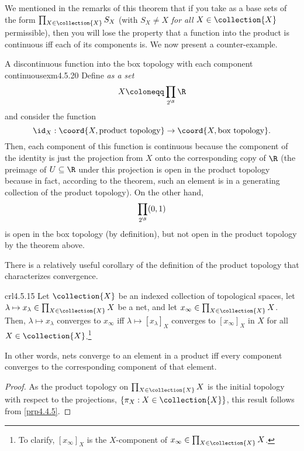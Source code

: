 We mentioned in the remarks of this theorem that if you take as a base sets of the form $\prod _{X\in \collection{X}}S_X$ (with $S_X\neq X$ \emph{for all $X\in \collection{X}$} permissible), then you will lose the property that a function into the product is continuous iff each of its components is.  We now present a counter-example.
\begin{exm}{A discontinuous function into the box topology with each component continuous}{exm4.5.20}
Define \emph{as a set}
\begin{equation}
X\coloneqq \prod _{2^{\N}}\R 
\end{equation}
and consider the function
\begin{equation}
\id _X:\coord{X,\text{product topology}}\rightarrow \coord{X,\text{box topology}}.
\end{equation}
Then, each component of this function is continuous because the component of the identity is just the projection from $X$ onto the corresponding copy of $\R$ (the preimage of $U\subseteq \R$ under this projection is open in the product topology because in fact, according to the theorem, such an element is in a generating collection of the product topology).  On the other hand,
\begin{equation}
\prod _{2^{\N}}(0,1)
\end{equation}
is open in the box topology (by definition), but not open in the product topology by the theorem above.
\end{exm}
There is a relatively useful corollary of the definition of the product topology that characterizes convergence.
\begin{crl}{}{crl4.5.15}
Let $\collection{X}$ be an indexed collection of topological spaces, let $\lambda \mapsto x_\lambda \in \prod _{X\in \collection{X}}X$ be a net, and let $x_\infty \in \prod _{X\in \collection{X}}X$.  Then, $\lambda \mapsto x_\lambda$ converges to $x_\infty$ iff $\lambda \mapsto [x_\lambda ]_X$ converges to $[x_\infty ]_X$ in $X$ for all $X\in \collection{X}$.\footnote{To clarify, $[x_{\infty}]_X$ is the $X$-component of $x_{\infty}\in \prod _{X\in \collection{X}}X$.}
\begin{rmk}
In other words, nets converge to an element in a product iff every component converges to the corresponding component of that element.
\end{rmk}
\begin{proof}
As the product topology on $\prod _{X\in \collection{X}}X$ is the initial topology with respect to the projections, $\{ \pi _X:X\in \collection{X}\}$, this result follows from \cref{prp4.4.5}.
\end{proof}
\end{crl}
